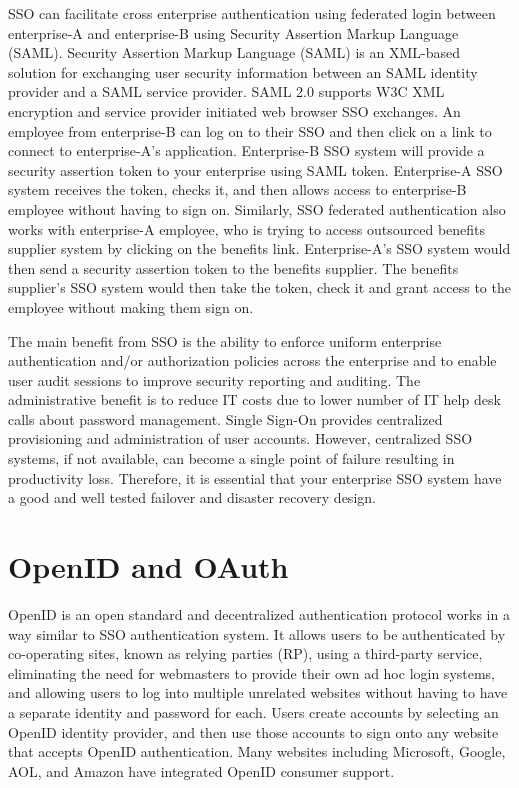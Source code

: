 \begin{multicols}{2}
SSO can facilitate cross enterprise authentication using federated login between enterprise-A and enterprise-B using Security Assertion Markup Language (SAML). Security Assertion Markup Language (SAML) is an XML-based solution for exchanging user security information between an SAML identity provider and a SAML service provider. SAML 2.0 supports W3C XML encryption and service provider initiated web browser SSO exchanges. An employee from enterprise-B can log on to their SSO and then click on a link to connect to enterprise-A's application. Enterprise-B SSO system will provide a security assertion token to your enterprise using SAML token. Enterprise-A SSO system receives the token, checks it, and then allows access to enterprise-B employee without having to sign on. Similarly, SSO federated authentication also works with enterprise-A employee, who is trying to access outsourced benefits supplier system by clicking on the benefits link. Enterprise-A's SSO system would then send a security assertion token to the benefits supplier. The benefits supplier's SSO system would then take the token, check it and grant access to the employee without making them sign on.

The main benefit from SSO is the ability to enforce uniform enterprise authentication and/or authorization policies across the enterprise and to enable user audit sessions to improve security reporting and auditing. The administrative benefit is to reduce IT costs due to lower number of IT help desk calls about password management. Single Sign-On provides centralized provisioning and administration of user accounts. However, centralized SSO systems, if not available, can become a single point of failure resulting in productivity loss. Therefore, it is essential that your enterprise SSO system have a good and well tested failover and disaster recovery design.

\section*{OpenID and OAuth}

OpenID is an open standard and decentralized authentication protocol works in a way similar to SSO authentication system. It allows users to be authenticated by co-operating sites, known as relying parties (RP), using a third-party service, eliminating the need for webmasters to provide their own ad hoc login systems, and allowing users to log into multiple unrelated websites without having to have a separate identity and password for each. Users create accounts by selecting an OpenID identity provider, and then use those accounts to sign onto any website that accepts OpenID authentication. Many websites including Microsoft, Google, AOL, and Amazon have integrated OpenID consumer support.


\end{multicols}
